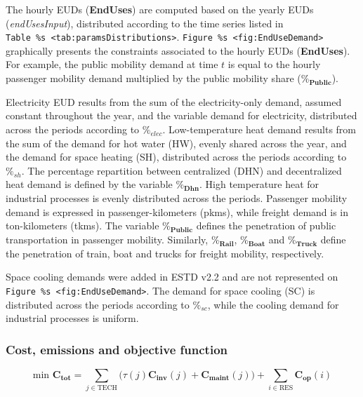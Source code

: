 \documentclass[
]{article}
\begin{document}
The hourly EUDs (\textbf{EndUses}) are computed based on the yearly EUDs
(\emph{endUsesInput}), distributed according to the time series listed
in
\texttt{Table\ \%s\ \textless{}tab:paramsDistributions\textgreater{}}.
\texttt{Figure\ \%s\ \textless{}fig:EndUseDemand\textgreater{}}
graphically presents the constraints associated to the hourly EUDs
(\textbf{EndUses}). For example, the public mobility demand at time
\(t\) is equal to the hourly passenger mobility demand multiplied by the
public mobility share (\(\textbf{\%}_{\textbf{Public}}
\)).

Electricity EUD results from the sum of the electricity-only demand,
assumed constant throughout the year, and the variable demand for
electricity, distributed across the periods according to \(\%_{elec}\).
Low-temperature heat demand results from the sum of the demand for hot
water (HW), evenly shared across the year, and the demand for space
heating (SH), distributed across the periods according to \(\%_{sh}\).
The percentage repartition between centralized (DHN) and decentralized
heat demand is defined by the variable \(\textbf{\%}_{\textbf{Dhn}}
\). High temperature heat for industrial processes is evenly distributed
across the periods. Passenger mobility demand is expressed in
passenger-kilometers (pkms), while freight demand is in ton-kilometers
(tkms). The variable \(\textbf{\%}_{\textbf{Public}}
\) defines the penetration of public transportation in passenger
mobility. Similarly, \(\textbf{\%}_{\textbf{Rail}}
\), \(\textbf{\%}_{\textbf{Boat}}
\) and \(\textbf{\%}_{\textbf{Truck}}
\) define the penetration of train, boat and trucks for freight
mobility, respectively.

Space cooling demands were added in ESTD v2.2 and are not represented on
\texttt{Figure\ \%s\ \textless{}fig:EndUseDemand\textgreater{}}. The
demand for space cooling (SC) is distributed across the periods
according to \(\%_{sc}\), while the cooling demand for industrial
processes is uniform.

\subsubsection{Cost, emissions and objective
function}\label{cost-emissions-and-objective-function}

{\[\text{min } \textbf{C}_{\textbf{tot}} = \sum_{j \in \text{TECH}} \Big(\textbf{$\tau$}(j) \textbf{C}_{\textbf{inv}}(j) + \textbf{C}_{\textbf{maint}} (j)\Big) + \sum_{i \in \text{RES}} \textbf{C}_{\textbf{op}}(i)\]}
\end{document}
